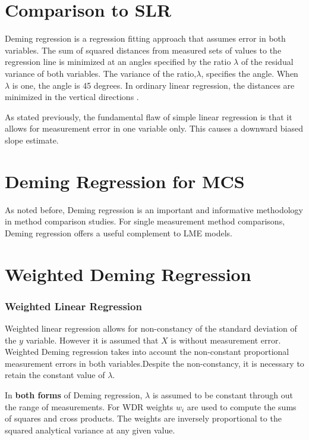 \documentclass[12pt, a4paper]{report}
\theoremstyle{plain}
\theoremstyle{definition}
\theoremstyle{remark}
\begin{document}
\section{Comparison to SLR}

Deming regression is a regression fitting approach that assumes error in both variables.
The sum of squared distances from measured sets of values to the regression line is minimized at an angles specified by the ratio $\lambda$ of the residual variance of both variables. The variance of the ratio,$\lambda$, specifies the angle.  When $\lambda$ is one, the angle is 45 degrees. In ordinary linear regression, the distances are minimized in the vertical directions \citep{linnet99}.

As stated previously, the fundamental flaw of simple linear regression is that it allows for measurement error in one variable only. This causes a downward biased slope estimate.



\section{Deming Regression for MCS}
As noted before, Deming regression is an important and informative methodology in method comparison studies.
For single measurement method comparisons, Deming regression offers a useful complement to LME models.


\section{Weighted Deming Regression}
\subsubsection{Weighted Linear Regression}
Weighted linear regression allows for non-constancy of the standard deviation of the $y$ variable. However it is assumed that $X$ is without measurement error. Weighted Deming regression takes into account the non-constant proportional measurement errors in both variables.Despite the non-constancy, it is necessary to retain the constant value of $\lambda$.

In \textbf{both forms} of Deming regression, $\lambda$ is assumed to be constant through out the range of measurements. For WDR weights $w_{i}$ are used to compute the sums of squares and cross products. The weights are inversely proportional to the squared analytical variance at any given value.
\end{document}
